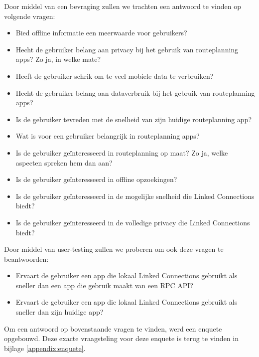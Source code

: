 Door middel van een bevraging zullen we trachten een antwoord te vinden op volgende vragen:
\begin{itemize}
	\item Bied offline informatie een meerwaarde voor gebruikers?
	\item Hecht de gebruiker belang aan privacy bij het gebruik van routeplanning apps? Zo ja, in welke mate?
	\item Heeft de gebruiker schrik om te veel mobiele data te verbruiken?
	\item Hecht de gebruiker belang aan dataverbruik bij het gebruik van routeplanning apps?
	\item Is de gebruiker tevreden met de snelheid van zijn huidige routeplanning app?
	\item Wat is voor een gebruiker belangrijk in routeplanning apps?
	\item Is de gebruiker geïnteresseerd in routeplanning op maat? Zo ja, welke aspecten spreken hem dan aan?
	\item Is de gebruiker geïnteresseerd in offline opzoekingen?
	\item Is de gebruiker geïnteresseerd in de mogelijke snelheid die Linked Connections biedt?
	\item Is de gebruiker geïnteresseerd in de volledige privacy die Linked Connections biedt?
\end{itemize}

Door middel van user-testing zullen we proberen om ook deze vragen te beantwoorden:
\begin{itemize}
	\item Ervaart de gebruiker een app die lokaal Linked Connections gebruikt als sneller dan een app die gebruik maakt van een RPC API?
	\item Ervaart de gebruiker een app die lokaal Linked Connections gebruikt als sneller dan zijn huidige app?
\end{itemize}

Om een antwoord op bovenstaande vragen te vinden, werd een enquete opgebouwd. Deze exacte vraagsteling voor deze enquete is terug te vinden in bijlage \ref{appendix:enquete}.